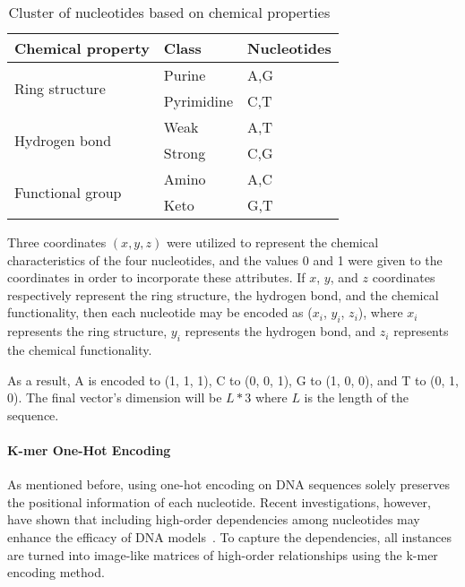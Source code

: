 \begin{table}[ht]
	\caption{Cluster of nucleotides based on chemical properties~\cite{GolamBari2013DNASequence}}
	\label{tab:chemical_encoding}
    \centering
    \begin{tabular}{lll}
    	\toprule
    	\textbf{Chemical property} & \textbf{Class} & \textbf{Nucleotides} \\\midrule
    	
    	\multirow{2}{*}{Ring structure} & Purine & A,G \\
    	& Pyrimidine & C,T\\\midrule
    	
    	\multirow{2}{*}{Hydrogen bond} & Weak & A,T\\
    	& Strong & C,G\\\midrule
    	
    	\multirow{2}{*}{Functional group} & Amino & A,C\\
    	& Keto & G,T\\
        
    	\bottomrule
    \end{tabular}
\end{table}

Three coordinates $(x, y, z)$ were utilized to represent the chemical characteristics of the four nucleotides, and the values 0 and 1 were given to the coordinates in order to incorporate these attributes. If $x$, $y$, and $z$ coordinates respectively represent the ring structure, the hydrogen bond, and the chemical functionality, then each nucleotide may be encoded as ($x_{i}$, $y_{i}$, $z_{i}$), where $x_{i}$ represents the ring structure, $y_{i}$ represents the hydrogen bond, and $z_{i}$ represents the chemical functionality.

As a result, \gls{A} is encoded to (1, 1, 1), \gls{C} to (0, 0, 1), \gls{G} to (1, 0, 0), and \gls{T} to (0, 1, 0). The final vector's dimension will be $L * 3$ where $L$ is the length of the sequence.


\paragraph{K-mer One-Hot Encoding}

As mentioned before, using one-hot encoding on \gls{DNA} sequences solely preserves the positional information of each nucleotide. Recent investigations, however, have shown that including high-order dependencies among nucleotides may enhance the efficacy of DNA models~\cite{Zhang2019ModelingNetwork}. To capture the dependencies, all instances are turned into image-like matrices of high-order relationships using the k-mer encoding method.

